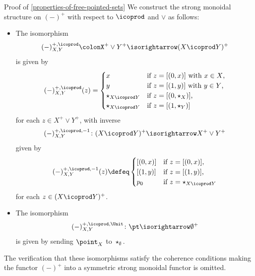 \begin{Proof}{Proof of \cref{properties-of-free-pointed-sets}}
    We construct the strong monoidal structure on $(-)^{+}$ with respect to $\icoprod$ and $\vee$ as follows:
    \begin{itemize}
        \item{}The isomorphism
            \[
                (-)^{+,\icoprod}_{X,Y}%
                \colon%
                X^{+}\vee Y^{+}%
                \isorightarrow
                (X\icoprod Y)^{+}
            \]%
            is given by
            \[
                (-)^{+,\icoprod}_{X,Y}(z)%
                =%
                \begin{cases}%
                    x                   &\text{if $z=[(0,x)]$ with $x\in X$,}\\%
                    y                   &\text{if $z=[(1,y)]$ with $y\in Y$,}\\%
                    \star_{X\icoprod Y} &\text{if $z=[(0,\star_{X})]$,}\\%
                    \star_{X\icoprod Y} &\text{if $z=[(1,\star_{Y})]$}%
                \end{cases}%
            \]%
            for each $z\in X^{+}\vee Y^{+}$, with inverse
            \[
                (-)^{+,\icoprod,-1}_{X,Y}
                \colon%
                (X\icoprod Y)^{+}
                \isorightarrow
                X^{+}\vee Y^{+}%
            \]%
            given by
            \[
                (-)^{+,\icoprod,-1}_{X,Y}(z)%
                \defeq%
                \begin{cases}
                    [(0,x)] &\text{if $z=[(0,x)]$,}\\
                    [(1,y)] &\text{if $z=[(1,y)]$,}\\
                    p_{0} &\text{if $z=\star_{X\icoprod Y}$}
                \end{cases}
            \]%
            for each $z\in(X\icoprod Y)^{+}$.
        \item{}The isomorphism
            \[
                (-)^{+,\icoprod,\Unit}_{X,Y}%
                \colon%
                \pt%
                \isorightarrow
                \emptyset^{+}%
            \]%
            is given by sending $\point_{X}$ to $\star_{\emptyset}$.
    \end{itemize}
    The verification that these isomorphisms satisfy the coherence conditions making the functor $(-)^{+}$ into a symmetric strong monoidal functor is omitted.


\end{Proof}
